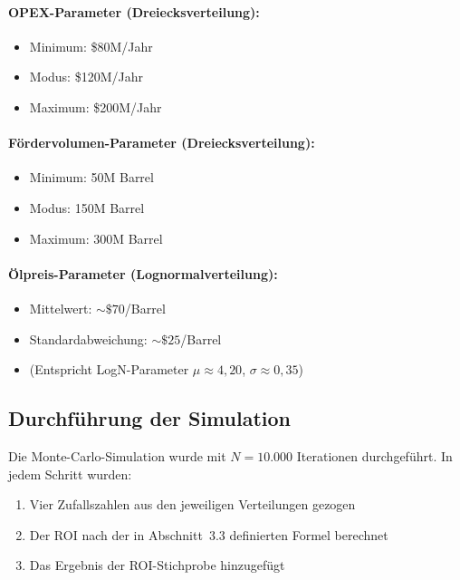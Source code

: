 \documentclass[11pt,a4paper]{article}
\begin{document}
\paragraph{OPEX-Parameter (Dreiecksverteilung):}
\begin{itemize}[itemsep=1pt]
  \item Minimum: \$80M/Jahr
  \item Modus: \$120M/Jahr
  \item Maximum: \$200M/Jahr
\end{itemize}

\paragraph{Fördervolumen-Parameter (Dreiecksverteilung):}
\begin{itemize}[itemsep=1pt]
  \item Minimum: 50M Barrel
  \item Modus: 150M Barrel
  \item Maximum: 300M Barrel
\end{itemize}

\paragraph{Ölpreis-Parameter (Lognormalverteilung):}
\begin{itemize}[itemsep=1pt]
  \item Mittelwert: ${\sim}\$70$/Barrel
  \item Standardabweichung: ${\sim}\$25$/Barrel
  \item (Entspricht LogN-Parameter $\mu \approx 4{,}20$, $\sigma \approx 0{,}35$)
\end{itemize}

\subsection{Durchführung der Simulation}

Die Monte-Carlo-Simulation wurde mit $N = 10.000$ Iterationen durchgeführt. In jedem Schritt wurden:
\begin{enumerate}[label=\arabic*., itemsep=2pt]
  \item Vier Zufallszahlen aus den jeweiligen Verteilungen gezogen
  \item Der ROI nach der in Abschnitt~3.3 definierten Formel berechnet
  \item Das Ergebnis der ROI-Stichprobe hinzugefügt
\end{enumerate}
\end{document}
